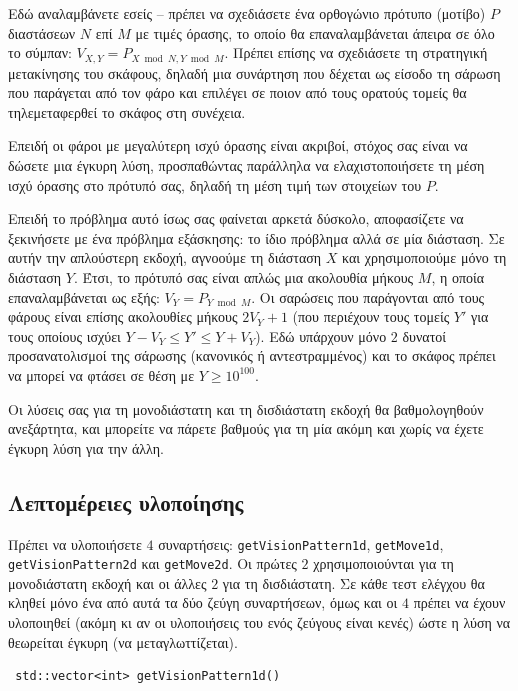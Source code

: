 \documentclass[12pt]{article}
\begin{document}
Εδώ αναλαμβάνετε εσείς -- πρέπει να σχεδιάσετε ένα ορθογώνιο πρότυπο (μοτίβο) $P$ διαστάσεων $N$ επί $M$ με τιμές όρασης, το οποίο θα επαναλαμβάνεται άπειρα σε όλο το σύμπαν: $V_{X, Y} = P_{X \bmod N, Y \bmod M}$. Πρέπει επίσης να σχεδιάσετε τη στρατηγική μετακίνησης του σκάφους, δηλαδή μια συνάρτηση που δέχεται ως είσοδο τη σάρωση που παράγεται από τον φάρο και επιλέγει σε ποιον από τους ορατούς τομείς θα τηλεμεταφερθεί το σκάφος στη συνέχεια.

Επειδή οι φάροι με μεγαλύτερη ισχύ όρασης είναι ακριβοί, στόχος σας είναι να δώσετε μια έγκυρη λύση, προσπαθώντας παράλληλα να ελαχιστοποιήσετε τη μέση ισχύ όρασης στο πρότυπό σας, δηλαδή τη μέση τιμή των στοιχείων του $P$.

Επειδή το πρόβλημα αυτό ίσως σας φαίνεται αρκετά δύσκολο, αποφασίζετε να ξεκινήσετε με ένα πρόβλημα εξάσκησης: το ίδιο πρόβλημα αλλά σε μία διάσταση. Σε αυτήν την απλούστερη εκδοχή, αγνοούμε τη διάσταση $X$ και χρησιμοποιούμε μόνο τη διάσταση $Y$. Έτσι, το πρότυπό σας είναι απλώς μια ακολουθία μήκους $M$, η οποία επαναλαμβάνεται ως εξής: $V_Y = P_{Y \bmod M}$. Οι σαρώσεις που παράγονται από τους φάρους είναι επίσης ακολουθίες μήκους $2V_Y + 1$ (που περιέχουν τους τομείς $Y'$ για τους οποίους ισχύει  $Y - V_Y \leq Y' \leq Y + V_Y$). Εδώ υπάρχουν μόνο $2$ δυνατοί προσανατολισμοί της σάρωσης (κανονικός ή αντεστραμμένος) και το σκάφος πρέπει να μπορεί να φτάσει σε θέση με $Y \geq 10^{100}$.

Οι λύσεις σας για τη μονοδιάστατη και τη δισδιάστατη εκδοχή θα βαθμολογηθούν ανεξάρτητα, και μπορείτε να πάρετε βαθμούς για τη μία ακόμη και χωρίς να έχετε έγκυρη λύση για την άλλη.

\subsection{Λεπτομέρειες υλοποίησης}

Πρέπει να υλοποιήσετε $4$ συναρτήσεις: \verb|getVisionPattern1d|, \verb|getMove1d|, \verb|getVisionPattern2d| και \verb|getMove2d|. Οι πρώτες $2$ χρησιμοποιούνται για τη μονοδιάστατη εκδοχή και οι άλλες $2$ για τη δισδιάστατη. Σε κάθε τεστ ελέγχου θα κληθεί μόνο ένα από αυτά τα δύο ζεύγη συναρτήσεων, όμως και οι $4$ πρέπει να έχουν υλοποιηθεί (ακόμη κι αν οι υλοποιήσεις του ενός ζεύγους είναι κενές) ώστε η λύση να θεωρείται έγκυρη (να μεταγλωττίζεται).

\begin{lstlisting}
 std::vector<int> getVisionPattern1d()
\end{lstlisting}
\end{document}
